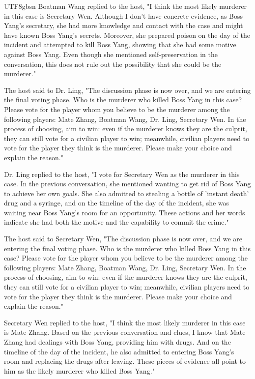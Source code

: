 \documentclass[11pt]{article}
\begin{document}
{\begin{CJK}{UTF8}{gbsn}
Boatman Wang replied to the host, "I think the most likely murderer in this case is Secretary Wen. Although I don't have concrete evidence, as Boss Yang's secretary, she had more knowledge and contact with the case and might have known Boss Yang's secrets. Moreover, she prepared poison on the day of the incident and attempted to kill Boss Yang, showing that she had some motive against Boss Yang. Even though she mentioned self-preservation in the conversation, this does not rule out the possibility that she could be the murderer."

The host said to Dr. Ling, "The discussion phase is now over, and we are entering the final voting phase. Who is the murderer who killed Boss Yang in this case? Please vote for the player whom you believe to be the murderer among the following players: Mate Zhang, Boatman Wang, Dr. Ling, Secretary Wen. In the process of choosing, aim to win: even if the murderer knows they are the culprit, they can still vote for a civilian player to win; meanwhile, civilian players need to vote for the player they think is the murderer. Please make your choice and explain the reason."

Dr. Ling replied to the host, "I vote for Secretary Wen as the murderer in this case. In the previous conversation, she mentioned wanting to get rid of Boss Yang to achieve her own goals. She also admitted to stealing a bottle of 'instant death' drug and a syringe, and on the timeline of the day of the incident, she was waiting near Boss Yang's room for an opportunity. These actions and her words indicate she had both the motive and the capability to commit the crime."

The host said to Secretary Wen, "The discussion phase is now over, and we are entering the final voting phase. Who is the murderer who killed Boss Yang in this case? Please vote for the player whom you believe to be the murderer among the following players: Mate Zhang, Boatman Wang, Dr. Ling, Secretary Wen. In the process of choosing, aim to win: even if the murderer knows they are the culprit, they can still vote for a civilian player to win; meanwhile, civilian players need to vote for the player they think is the murderer. Please make your choice and explain the reason."

Secretary Wen replied to the host, "I think the most likely murderer in this case is Mate Zhang. Based on the previous conversation and clues, I know that Mate Zhang had dealings with Boss Yang, providing him with drugs. And on the timeline of the day of the incident, he also admitted to entering Boss Yang's room and replacing the drugs after leaving. These pieces of evidence all point to him as the likely murderer who killed Boss Yang."




\end{CJK}}
\end{document}
